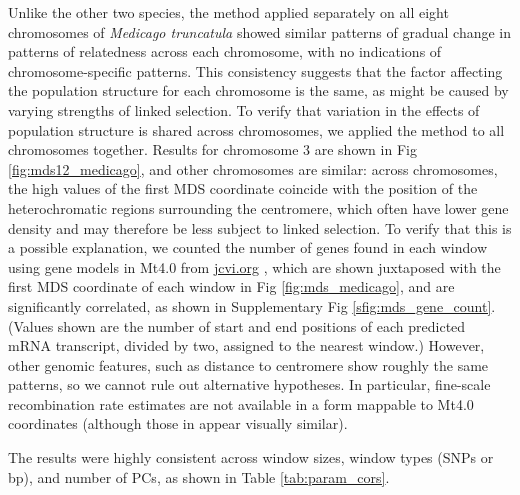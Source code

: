 \documentclass[11pt, oneside]{article}   	%
\newcommand\citet{\cite}
\newcommand\citep{\cite}
\newcommand{\Figure}{Fig }
\newcommand{\Figure}{{Figure }}
\renewcommand{\revpoint}[2]{\relax}
\begin{document}
Unlike the other two species,
the method applied separately on all eight chromosomes of \textit{Medicago truncatula} 
showed similar patterns of gradual change in patterns of relatedness across each chromosome,
with no indications of chromosome-specific patterns.
This consistency suggests that the factor affecting the population structure for each chromosome is the same,
as might be caused by varying strengths of linked selection.
To verify that variation in the effects of population structure is shared across chromosomes,
we applied the method to all chromosomes together.
Results for chromosome 3 are shown in \Figure \ref{fig:mds12_medicago}, %
and other chromosomes are similar:
across chromosomes, the high values of the first MDS coordinate coincide with the position of the heterochromatic regions surrounding the centromere,
which often have lower gene density and may therefore be less subject to linked selection.
To verify that this is a possible explanation,
we counted the number of genes found in each window using gene models in Mt4.0 from \url{jcvi.org} \citep{tang2014improved},
which are shown juxtaposed with
the first MDS coordinate of each window in \Figure \ref{fig:mds_medicago},
and are significantly correlated, as shown in Supplementary \Figure \ref{sfig:mds_gene_count}.
(Values shown are the number of start and end positions of each predicted mRNA transcript,
divided by two, assigned to the nearest window.)
However, other genomic features, such as distance to centromere show roughly the same patterns,
so we cannot rule out alternative hypotheses.
In particular, fine-scale recombination rate estimates are not available in a form mappable
to Mt4.0 coordinates (although those in \citet{paape2012finescale} appear visually similar).

The results were highly consistent across window sizes, window types (SNPs or bp),
and number of PCs, as shown in Table \ref{tab:param_cors}.
\end{document}
